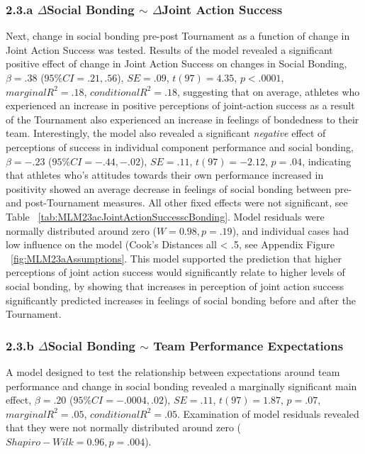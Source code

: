 \subsubsection{2.3.a $\Delta$Social Bonding $\sim$ $\Delta$Joint Action Success}
Next, change in social bonding pre-post Tournament as a function of change in Joint Action Success was tested. Results of the model revealed a significant positive effect of change in Joint Action Success on changes in Social Bonding, $\beta = .38$ ($95\% CI =  .21, .56$), $SE = .09$, $t(97) = 4.35$, $p < .0001$, $marginal R^2 = .18$, $conditional R^2 = .18$, suggesting that on average, athletes who experienced an increase in positive perceptions of joint-action success as a result of the Tournament also experienced an increase in feelings of bondedness to their team.  Interestingly, the model also revealed a significant \textit{negative} effect of perceptions of success in individual component performance and social bonding, $\beta = -.23$ ($95\% CI =  -.44, -.02$), $SE = .11$, $t(97) = -2.12$, $p = .04$, indicating that athletes who's attitudes towards their own performance increased in positivity showed an average decrease in feelings of social bonding between pre- and post-Tournament measures. All other fixed effects were not significant, see Table ~\ref{tab:MLM23acJointActionSuccesscBonding}. Model residuals were normally distributed around zero ($W = 0.98, p = .19$), and individual cases had low influence on the model (Cook's Distances all < .5, see Appendix Figure ~\ref{fig:MLM23aAssumptions}.  This model supported the prediction that higher perceptions of joint action success would significantly relate to higher levels of social bonding, by showing that increases in perception of joint action success significantly predicted increases in feelings of social bonding before and after the Tournament.







\subsubsection{2.3.b $\Delta$Social Bonding $\sim$ Team Performance Expectations}
A model designed to test the relationship between expectations around team performance and change in social bonding revealed a marginally significant main effect, $\beta = .20$ ($95\% CI =  -.0004, .02$), $SE = .11$, $t(97) = 1.87$, $p = .07$, $marginal R^2 = .05$, $conditional R^2 = .05$.  Examination of model residuals revealed that they were not normally distributed around zero ($Shapiro-Wilk = 0.96, p = .004$).

